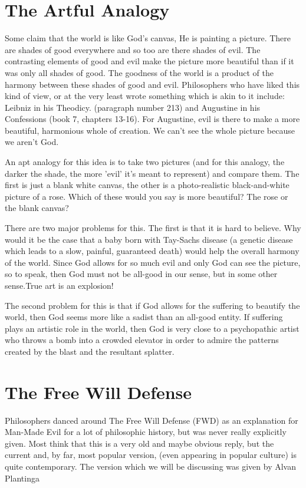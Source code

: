 \section{The Artful Analogy}
Some claim that the world is like God’s canvas, He is painting a picture. There are shades of good everywhere and so too are there shades of evil. The contrasting elements of good and evil make the picture more beautiful than if it was only all shades of good. The goodness of the world is a product of the harmony between these shades of good and evil. Philosophers who have liked this kind of view, or at the very least wrote something which is akin to it include: Leibniz in his Theodicy\autocite{Leibniz1}. (paragraph number 213) and Augustine in his Confessions (book 7, chapters 13-16).\autocite{Augustine1} For Augustine, evil is there to make a more beautiful, harmonious whole of creation. We can't see the whole picture because we aren't God. 

An apt analogy for this idea is to take two pictures (and for this analogy, the darker the shade, the more 'evil' it's meant to represent) and compare them. The first is just a blank white canvas, the other is a photo-realistic black-and-white picture of a rose. Which of these would you say is more beautiful? The rose or the blank canvas?

There are two major problems for this. The first is that it is hard to believe. Why would it be the case that a baby born with Tay-Sachs disease (a genetic disease which leads to a slow, painful, guaranteed death) would help the overall harmony of the world. Since God allows for so much evil and only God can see the picture, so to speak, then God must not be all-good in our sense, but in some other sense.True art is an explosion!

The second problem for this is that if God allows for the suffering to beautify the world, then God seems more like a sadist than an all-good entity. If suffering plays an artistic role in the world, then God is very close to a psychopathic artist who throws a bomb into a crowded elevator in order to admire the patterns created by the blast and the resultant splatter.

\section{The Free Will Defense}
Philosophers danced around The Free Will Defense (FWD) as an explanation for Man-Made Evil for a lot of philosophic history, but was never really explicitly given. Most think that this is a very old and maybe obvious reply, but the current and,  by far, most popular version, (even appearing in popular culture) is quite contemporary. The version which we will be discussing was given by Alvan Plantinga\autocite{Plantinga1}

